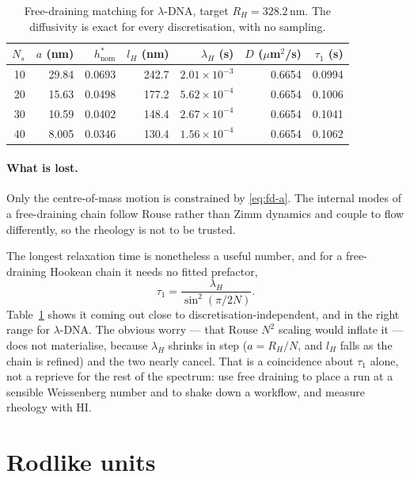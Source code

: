 \documentclass[11pt,a4paper]{report}
\begin{document}
\begin{table}[ht]
\centering
\caption{Free-draining matching for $\lambda$-DNA, target $R_H = 328.2$\,nm. The
diffusivity is exact for every discretisation, with no sampling.}
\label{tab:free-draining}
\begin{tabular}{@{}rrrrrrr@{}}
\toprule
$N_s$ & $a$ (nm) & $h^{*}_{\mathrm{nom}}$ & $l_H$ (nm) & $\lambda_H$ (s) & $D$ ($\mu$m$^2$/s) & $\tau_1$ (s) \\
\midrule
10 & 29.84 & 0.0693 & 242.7 & $2.01\times10^{-3}$ & 0.6654 & 0.0994 \\
20 & 15.63 & 0.0498 & 177.2 & $5.62\times10^{-4}$ & 0.6654 & 0.1006 \\
30 & 10.59 & 0.0402 & 148.4 & $2.67\times10^{-4}$ & 0.6654 & 0.1041 \\
40 & 8.005 & 0.0346 & 130.4 & $1.56\times10^{-4}$ & 0.6654 & 0.1062 \\
\bottomrule
\end{tabular}
\end{table}

\paragraph{What is lost.} Only the centre-of-mass motion is constrained by
\eqref{eq:fd-a}. The internal modes of a free-draining chain follow Rouse rather
than Zimm dynamics and couple to flow differently, so the rheology is not to be
trusted.

The longest relaxation time is nonetheless a useful number, and for a free-draining
Hookean chain it needs no fitted prefactor,
\begin{equation}
  \tau_1 = \frac{\lambda_H}{\sin^{2}\!\left(\pi/2N\right)} .
\end{equation}
Table~\ref{tab:free-draining} shows it coming out close to
discretisation-independent, and in the right range for $\lambda$-DNA. The obvious
worry --- that Rouse $N^{2}$ scaling would inflate it --- does not materialise,
because $\lambda_H$ shrinks in step ($a = R_H/N$, and $l_H$ falls as the chain is
refined) and the two nearly cancel. That is a coincidence about $\tau_1$ alone,
not a reprieve for the rest of the spectrum: use free draining to place a run at a
sensible Weissenberg number and to shake down a workflow, and measure rheology
with HI.

\section{Rodlike units}
\label{sec:rodlike}
\end{document}
